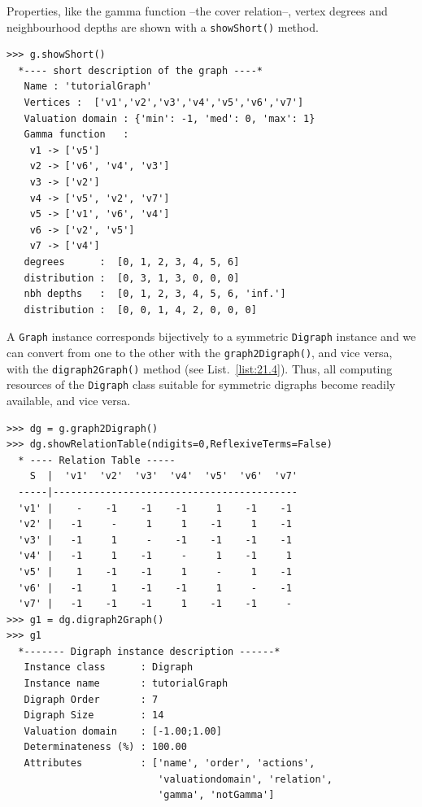 Properties, like the gamma function --the cover relation--, vertex degrees and neighbourhood depths are shown with a \texttt{showShort()} method. 
\begin{lstlisting}[caption={Inspecting a graph instance},label=list:21.3]
>>> g.showShort()
  *---- short description of the graph ----*
   Name : 'tutorialGraph'
   Vertices :  ['v1','v2','v3','v4','v5','v6','v7']
   Valuation domain : {'min': -1, 'med': 0, 'max': 1}
   Gamma function   : 
    v1 -> ['v5']
    v2 -> ['v6', 'v4', 'v3']
    v3 -> ['v2']
    v4 -> ['v5', 'v2', 'v7']
    v5 -> ['v1', 'v6', 'v4']
    v6 -> ['v2', 'v5']
    v7 -> ['v4']
   degrees      :  [0, 1, 2, 3, 4, 5, 6]
   distribution :  [0, 3, 1, 3, 0, 0, 0]
   nbh depths   :  [0, 1, 2, 3, 4, 5, 6, 'inf.']
   distribution :  [0, 0, 1, 4, 2, 0, 0, 0]
\end{lstlisting}

A \texttt{Graph} instance corresponds bijectively to a symmetric \texttt{Digraph} instance and we can convert from one to the other with the \texttt{graph2Digraph()}, and vice versa, with the \texttt{digraph2Graph()} method (see List.~\vref{list:21.4}). Thus, all computing resources of the \texttt{Digraph} class suitable for symmetric digraphs become readily available, and vice versa.
\begin{lstlisting}[caption={Conversion between graphs and digraphs},label=list:21.4]
>>> dg = g.graph2Digraph()
>>> dg.showRelationTable(ndigits=0,ReflexiveTerms=False)
  * ---- Relation Table -----
    S  |  'v1'  'v2'  'v3'  'v4'  'v5'  'v6'  'v7'	  
  -----|------------------------------------------
  'v1' |    -    -1    -1    -1     1    -1    -1	 
  'v2' |   -1     -     1     1    -1     1    -1	 
  'v3' |   -1     1     -    -1    -1    -1    -1	 
  'v4' |   -1     1    -1     -     1    -1     1	 
  'v5' |    1    -1    -1     1     -     1    -1	 
  'v6' |   -1     1    -1    -1     1     -    -1	 
  'v7' |   -1    -1    -1     1    -1    -1     -
>>> g1 = dg.digraph2Graph()
>>> g1
  *------- Digraph instance description ------*
   Instance class      : Digraph
   Instance name       : tutorialGraph
   Digraph Order       : 7
   Digraph Size        : 14
   Valuation domain    : [-1.00;1.00]
   Determinateness (%) : 100.00
   Attributes          : ['name', 'order', 'actions',
                          'valuationdomain', 'relation',
                          'gamma', 'notGamma']
\end{lstlisting}

